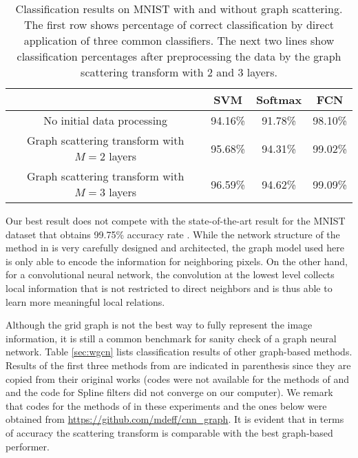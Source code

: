 \documentclass{article}
\begin{document}
\begin{table}[!ht]
\centering
\begin{tabular}{|c|c|c|c|}
\hline
~ & SVM & Softmax & FCN \\
\hline
No initial data processing  & 94.16\% & 91.78\% & 98.10\% \\
\hline
Graph scattering transform with $M=2$ layers & 95.68\% & 94.31\% & {99.02}\% \\
\hline
Graph scattering transform with $M=3$ layers & 96.59\% & 94.62\% & {99.09}\%\\
\hline
\end{tabular}
\caption{Classification results on MNIST with and without graph scattering. The first row shows percentage of correct classification by direct application of three common classifiers. The next two lines show classification percentages after preprocessing the data by the graph scattering transform with 2 and 3 layers. }
\label{tab:mnist}
\end{table}

Our best result does not compete with the state-of-the-art result for the MNIST dataset {that obtains 99.75\% accuracy rate \cite{SabFH17}.}
{While the network structure of the method in \cite{SabFH17} is very carefully designed and architected, the graph model used here is only able to encode the information for neighboring pixels. On the other hand, for a convolutional neural network, the convolution at the lowest level collects local information that is not restricted to direct neighbors and is thus able to learn more meaningful local relations.}


{Although the grid graph is not the best way to fully represent the image information, it is still a common benchmark for sanity check of a graph neural network.} Table \ref{sec:wgcn} lists classification results of other graph-based methods. {Results of the first three methods from \cite{EdwX16, HecCQ17, DefBV16} are indicated in parenthesis since they are copied from their original works (codes were not available for the methods of \cite{EdwX16} and \cite{HecCQ17} and the code for Spline filters \cite{DefBV16} did not converge on our computer).
We remark that codes for the methods of \cite{DefBV16} in these experiments and the ones below were obtained from \url{https://github.com/mdeff/cnn\_graph}. }
It is evident that {in terms of accuracy} the scattering transform is comparable with the best graph-based performer.
\end{document}
